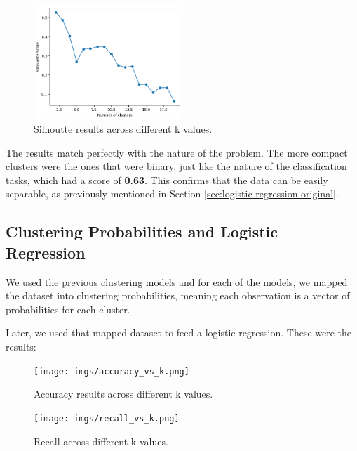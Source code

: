 \documentclass[a4paper,12pt]{article}
\begin{document}
\begin{figure}[H]
    \centering
    \includegraphics[width=0.5\textwidth]{imgs/silhouette.png}
    \caption{Silhoutte results across different k values.}
    \label{fig:silhouette}
\end{figure}


The results match perfectly with the nature of the problem. The more compact clusters were the ones that were binary, just like the nature of the classification tasks, which had a score of \textbf{0.63}. This confirms that the data can be easily separable, as previously mentioned in Section \ref{sec:logistic-regression-original}.

\subsection{Clustering Probabilities and Logistic Regression}
We used the previous clustering models and for each of the models, we mapped the dataset into clustering probabilities, meaning each observation is a vector of probabilities for each cluster.

Later, we used that mapped dataset to feed a logistic regression. These were the results:

\begin{figure}[H]
    \centering
    \begin{minipage}{0.48\textwidth}
        \centering
        \texttt{[image: imgs/accuracy\_vs\_k.png]}  %
        \caption{Accuracy results across different k values.}
        \label{fig:silhouette1}
    \end{minipage}
    \hfill
    \begin{minipage}{0.48\textwidth}
        \centering
        \texttt{[image: imgs/recall\_vs\_k.png]}  %
        \caption{Recall across different k values.}
        \label{fig:silhouette2}
    \end{minipage}
\end{figure}
\end{document}
